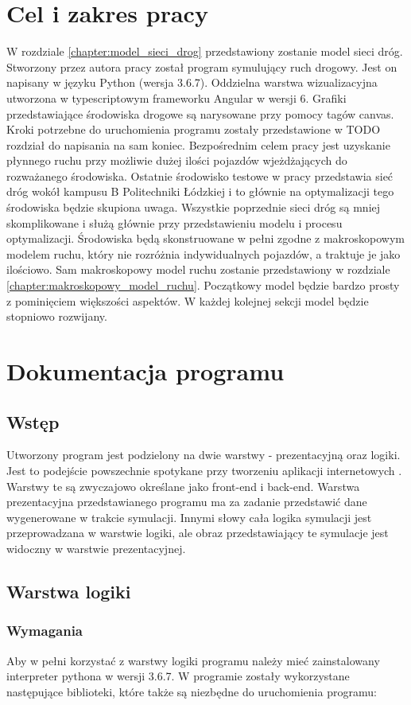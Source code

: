 \documentclass[12pt]{book}
\theoremstyle{plain}
\begin{document}
\chapter{Cel i zakres pracy}
W rozdziale \ref{chapter:model_sieci_drog} przedstawiony zostanie model sieci dróg. Stworzony przez autora pracy został program symulujący ruch drogowy. Jest on napisany w języku Python (wersja 3.6.7). Oddzielna warstwa wizualizacyjna utworzona w typescriptowym frameworku Angular w wersji 6. Grafiki przedstawiające środowiska drogowe są narysowane przy pomocy tagów canvas. Kroki potrzebne do uruchomienia programu zostały przedstawione w TODO rozdział do napisania na sam koniec.
Bezpośrednim celem pracy jest uzyskanie płynnego ruchu przy możliwie dużej ilości pojazdów wjeżdżających do rozważanego środowiska. Ostatnie środowisko testowe w pracy przedstawia sieć dróg wokół kampusu B Politechniki Łódzkiej i to głównie na optymalizacji tego środowiska będzie skupiona uwaga. Wszystkie poprzednie sieci dróg są mniej skomplikowane i służą głównie przy przedstawieniu modelu i procesu optymalizacji.
Środowiska będą skonstruowane w pełni zgodne z makroskopowym modelem ruchu, który nie rozróżnia indywidualnych pojazdów, a traktuje je jako ilościowo. Sam makroskopowy model ruchu zostanie przedstawiony w rozdziale \ref{chapter:makroskopowy_model_ruchu}. Początkowy model będzie bardzo prosty z pominięciem większości aspektów. W każdej kolejnej sekcji model będzie stopniowo rozwijany.

\chapter{Dokumentacja programu}
\section{Wstęp}
Utworzony program jest podzielony na dwie warstwy - prezentacyjną oraz logiki. Jest to podejście powszechnie spotykane przy tworzeniu aplikacji internetowych \cite{frontend_backend}. Warstwy te są zwyczajowo określane jako front-end i back-end. Warstwa prezentacyjna przedstawianego programu ma za zadanie przedstawić dane wygenerowane w trakcie symulacji. Innymi słowy cała logika symulacji jest przeprowadzana w warstwie logiki, ale obraz przedstawiający te symulacje jest widoczny w warstwie prezentacyjnej. 
\section{Warstwa logiki}
\subsection{Wymagania}
Aby w pełni korzystać z warstwy logiki programu należy mieć zainstalowany interpreter pythona w wersji 3.6.7. W programie zostały wykorzystane następujące biblioteki, które także są niezbędne do uruchomienia programu: \newline
\end{document}
